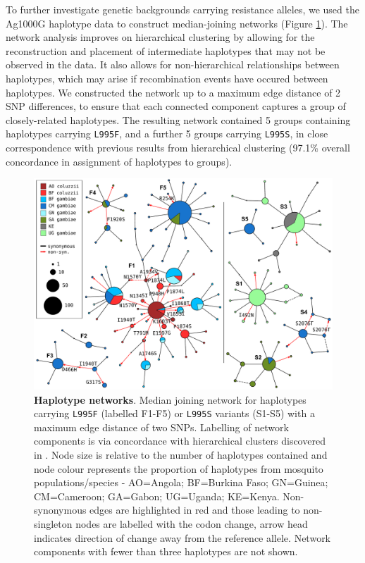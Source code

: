 \documentclass[a4paper,11pt,abstracton,hidelinks]{scrartcl}
\begin{document}
%
To further investigate genetic backgrounds carrying resistance alleles, we used the Ag1000G haplotype data to construct median-joining networks \cite{Bandelt1999} (Figure \ref{fig:networks}).
%
The network analysis improves on hierarchical clustering by allowing for the reconstruction and placement of intermediate haplotypes that may not be observed in the data.
%
It also allows for non-hierarchical relationships between haplotypes, which may arise if recombination events have occured between haplotypes.
%
We constructed the network up to a maximum edge distance of 2 SNP differences, to ensure that each connected component captures a group of closely-related haplotypes.
%
The resulting network contained 5 groups containing haplotypes carrying \texttt{L995F}, and a further 5 groups carrying \texttt{L995S}, in close correspondence with previous results from hierarchical clustering (97.1\% overall concordance in assignment of haplotypes to groups).
%


%
\begin{figure}[!t]
  \includegraphics[width=1.1\linewidth,center]{artwork/complete_networks.pdf}
  \caption{\textbf{Haplotype networks}. Median joining network for haplotypes carrying \texttt{L995F} (labelled F1-F5) or \texttt{L995S} variants (S1-S5) with a maximum edge distance of two SNPs. Labelling of network components is via concordance with hierarchical clusters discovered in \cite{Ag1000gConsortium2017}. Node size is relative to the number of haplotypes contained and node colour represents the proportion of haplotypes from mosquito populations/species - AO=Angola; BF=Burkina Faso; GN=Guinea; CM=Cameroon; GA=Gabon; UG=Uganda; KE=Kenya. Non-synonymous edges are highlighted in red and those leading to non-singleton nodes are labelled with the codon change, arrow head indicates direction of change away from the reference allele. Network components with fewer than three haplotypes are not shown.}
  \label{fig:networks}
\end{figure}
\end{document}
